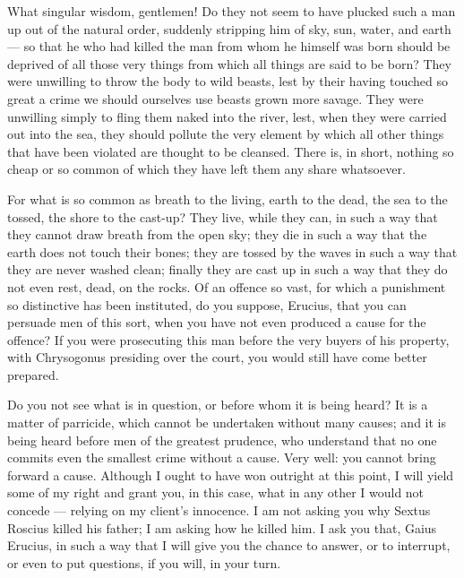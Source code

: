  What singular wisdom, gentlemen! Do they not seem to have plucked such a man up out of the natural order, suddenly stripping him of sky, sun, water, and earth --- so that he who had killed the man from whom he himself was born should be deprived of all those very things from which all things are said to be born? They were unwilling to throw the body to wild beasts, lest by their having touched so great a crime we should ourselves use beasts grown more savage. They were unwilling simply to fling them naked into the river, lest, when they were carried out into the sea, they should pollute the very element by which all other things that have been violated are thought to be cleansed. There is, in short, nothing so cheap or so common of which they have left them any share whatsoever.

 For what is so common as breath to the living, earth to the dead, the sea to the tossed, the shore to the cast-up? They live, while they can, in such a way that they cannot draw breath from the open sky; they die in such a way that the earth does not touch their bones; they are tossed by the waves in such a way that they are never washed clean; finally they are cast up in such a way that they do not even rest, dead, on the rocks. Of an offence so vast, for which a punishment so distinctive has been instituted, do you suppose, Erucius, that you can persuade men of this sort, when you have not even produced a cause for the offence? If you were prosecuting this man before the very buyers of his property, with Chrysogonus presiding over the court, you would still have come better prepared.

 Do you not see what is in question, or before whom it is being heard? It is a matter of parricide, which cannot be undertaken without many causes; and it is being heard before men of the greatest prudence, who understand that no one commits even the smallest crime without a cause. Very well: you cannot bring forward a cause. Although I ought to have won outright at this point, I will yield some of my right and grant you, in this case, what in any other I would not concede --- relying on my client's innocence. I am not asking you why Sextus Roscius killed his father; I am asking how he killed him. I ask you that, Gaius Erucius, in such a way that I will give you the chance to answer, or to interrupt, or even to put questions, if you will, in your turn.

